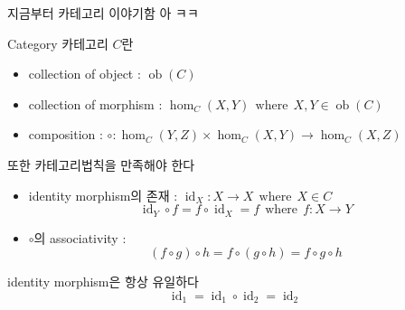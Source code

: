 \documentclass[t]{beamer}
\newcommand\where[0]{\ \ \text{where} \ \ }
\newcommand\cthom[3]{\operatorname{hom}_{#1}(#2,#3)}
\newcommand\ctid[1]{\operatorname{id}_{#1}}
\begin{document}

\begin{frame}[c]
  \begin{center}
    \huge 지금부터 카테고리 이야기함 아 ㅋㅋ
  \end{center}
\end{frame}

\begin{frame}{Category}
  카테고리 \(C\)란
  \begin{itemize}
    \item collection of object : \(\operatorname{ob}(C)\)
    \item collection of morphism : \( \cthom{C}{X}{Y} \where X, Y \in \operatorname{ob}(C) \)
    \item composition : \( \circ : \cthom{C}{Y}{Z} \times \cthom{C}{X}{Y} \to \cthom{C}{X}{Z} \)
  \end{itemize}
  \pause
  또한 카테고리법칙을 만족해야 한다
  \begin{itemize}
    \item identity morphism의 존재 : \( \ctid{X} : X \to X \where X \in C \)
      \[ \ctid{Y} \circ f = f \circ \ctid{X} = f \where f : X \to Y \]
    \item \(\circ\)의 associativity :
      \[ (f \circ g) \circ h = f \circ (g \circ h) = f \circ g \circ h \]
  \end{itemize}
  \pause
  identity morphism은 항상 유일하다
  \[ \ctid{1} = \ctid{1} \circ \ctid{2} = \ctid{2} \]
\end{frame}
\end{document}
